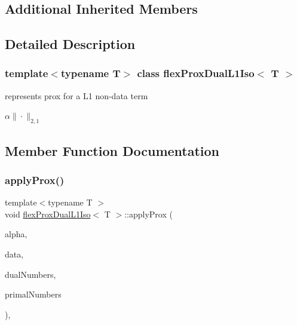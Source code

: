 \subsection*{Additional Inherited Members}


\subsection{Detailed Description}
\subsubsection*{template$<$typename T$>$\newline
class flex\+Prox\+Dual\+L1\+Iso$<$ T $>$}

represents prox for a L1 non-\/data term 

$ \alpha \|\cdot\|_{2,1} $ 

\subsection{Member Function Documentation}
\mbox{\label{classflex_prox_dual_l1_iso_afbf9d355a5c633355233f6b7d6026465}} 
\subsubsection{\texorpdfstring{apply\+Prox()}{applyProx()}\hspace{0.1cm}{\footnotesize\ttfamily [1/2]}}
{\footnotesize\ttfamily template$<$typename T $>$ \\
void \hyperlink{classflex_prox_dual_l1_iso}{flex\+Prox\+Dual\+L1\+Iso}$<$ T $>$\+::apply\+Prox (\begin{DoxyParamCaption}\item[{T}]{alpha,  }\item[{\hyperlink{classflex_box_data}{flex\+Box\+Data}$<$ T $>$ $\ast$}]{data,  }\item[{const std\+::vector$<$ int $>$ \&}]{dual\+Numbers,  }\item[{const std\+::vector$<$ int $>$ \&}]{primal\+Numbers }\end{DoxyParamCaption})\hspace{0.3cm}{\ttfamily [inline]}, {\ttfamily [virtual]}}



